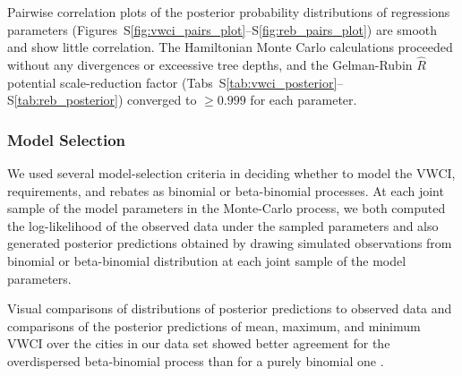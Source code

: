 \documentclass[draft]{agujournal}
\begin{document}
\iffalse
Collinearity among the predictor variables is diagnosed by observing correlations in the joint posterior probability distributions of the regression coefficients \citep[pp.~288--293]{stan_manual_2015}. Inefficient sampling due to varying curvature in the log-probability manifold or poorly chosen priors can be diagnosed by irregularities in joint posterior distributions \citep[pp.~316--321]{stan_manual_2015}. Pairwise correlation plots of the Monte-Carlo samples for the regression coefficients in our models of VWCI, requirements, and rebates (Figs.~S\ref{fig:vwci_pairs_plot}--S\ref{fig:reb_pairs_plot}) are smooth with little correlation and give no cause for concern.
In addition, the Hamiltonian Monte Carlo calculations proceeded without any divergences or exceessive tree depths, and the Gelman-Rubin $\hat R$ potential scale-reduction factor converged to $\ge 0.999$ for each parameter \citep{stan_manual_2015}.
\else
Pairwise correlation plots of the posterior probability distributions of regressions parameters (Figures~S\ref{fig:vwci_pairs_plot}--S\ref{fig:reb_pairs_plot}) are smooth and show little correlation. The Hamiltonian Monte Carlo calculations proceeded without any divergences or exceessive tree depths, and the Gelman-Rubin $\hat R$ potential scale-reduction factor (Tabs~S\ref{tab:vwci_posterior}--S\ref{tab:reb_posterior}) converged to $\ge 0.999$ for each parameter.
\fi

\subsubsection*{Model Selection}

\iffalse
We used several model-selection criteria in deciding whether to model the VWCI, requirements, and rebates as binomial or beta-binomial processes. At each joint sample of the model parameters in the Monte-Carlo process, we both computed the log-likelihood of the observed data under the sampled parameters and also generated posterior predictions obtained by drawing simulated observations from binomial or beta-binomial distribution at each joint sample of the model parameters.

Visual comparisons of distributions of posterior predictions to observed data and comparisons of the posterior predictions of mean, maximum, and minimum VWCI over the cities in our data set showed better agreement for the overdispersed beta-binomial process than for a purely binomial one \cite{gelman_bda_2014}.
\end{document}
